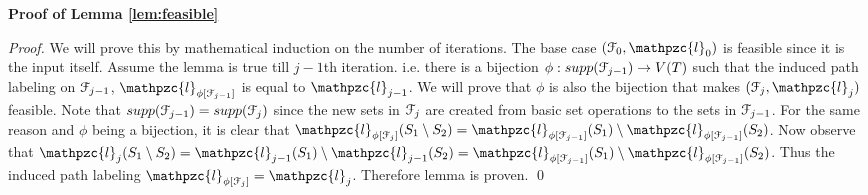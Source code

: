 \documentclass[a4paper,UKenglish,numberwithinsect]{lipics} %
\def\cF{{\cal F}}
\def\cl{\mathpzc{l}}
\begin{document}
\noindent
{\bf Proof of Lemma \ref{lem:feasible}}
\begin{proof}
  We will prove this by mathematical induction on the number of
  iterations. The base case $(\cF_0, \cl_0)$ is feasible since it is
  the input itself. Assume the lemma is true till $j-1$th
  iteration. i.e. there is a bijection $\phi: supp(\cF_{j-1})
  \rightarrow V(T)$ such that the induced path labeling on $\cF_{j-1}$,
   $\cl_{\phi[{\cF_{j-1}}]}$ is equal to $\cl_{j-1}$. We will prove that $\phi$ is
  also the bijection that makes $(\cF_j, \cl_j)$ feasible. Note that
  $supp(\cF_{j-1}) = supp(\cF_{j})$ since the new sets in $\cF_j$ are
  created from basic set operations to the sets in $\cF_{j-1}$. For
  the same reason and
  $\phi$ being a bijection, it is clear that $ \cl_{\phi[{\cF_{j}}]}(S_1
  \setminus S_2) = \cl_{\phi[{\cF_{j-1}}]}(S_1) \setminus
  \cl_{\phi[{\cF_{j-1}}]}(S_2)$. Now observe that $ \cl_j(S_1
  \setminus S_2) = \cl_{j-1}(S_1) \setminus \cl_{j-1}(S_2) =
  \cl_{\phi[{\cF_{j-1}}]}(S_1) \setminus
  \cl_{\phi[{\cF_{j-1}}]}(S_2)$. Thus the induced path labeling $\cl_{\phi[{\cF_{j}}]} =
  \cl_{j}$. Therefore lemma is proven. 
\qed
\end{proof}
\end{document}

